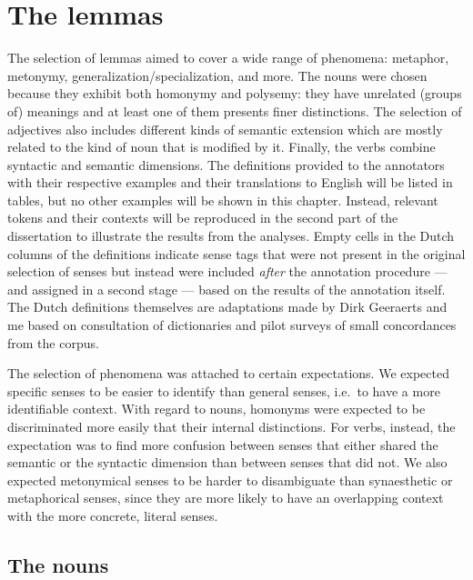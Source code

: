 \documentclass[
]{book}
\begin{document}
\hypertarget{selection}{%
\section{The lemmas}\label{selection}}

The selection of lemmas aimed to cover a wide range of phenomena: metaphor, metonymy, generalization/specialization, and more. The nouns were chosen because they exhibit both homonymy and polysemy: they have unrelated (groups of) meanings and at least one of them presents finer distinctions. The selection of adjectives also includes different kinds of semantic extension which are mostly related to the kind of noun that is modified by it. Finally, the verbs combine syntactic and semantic dimensions. The definitions provided to the annotators with their respective examples and their translations to English will be listed in tables, but no other examples will be shown in this chapter. Instead, relevant tokens and their contexts will be reproduced in the second part of the dissertation to illustrate the results from the analyses. Empty cells in the Dutch columns of the definitions indicate sense tags that were not present in the original selection of senses but instead were included \emph{after} the annotation procedure --- and assigned in a second stage --- based on the results of the annotation itself. The Dutch definitions themselves are adaptations made by Dirk Geeraerts and me based on consultation of dictionaries \autocites[e.g.][]{vandale_groot,vandale_klein} and pilot surveys of small concordances from the corpus.

The selection of phenomena was attached to certain expectations. We expected specific senses to be easier to identify than general senses, i.e.~to have a more identifiable context. With regard to nouns, homonyms were expected to be discriminated more easily that their internal distinctions. For verbs, instead, the expectation was to find more confusion between senses that either shared the semantic or the syntactic dimension than between senses that did not.
We also expected metonymical senses to be harder to disambiguate than synaesthetic or metaphorical senses, since they are more likely to have an overlapping context with the more concrete, literal senses.

\hypertarget{nouns}{%
\subsection{The nouns}\label{nouns}}
\end{document}
